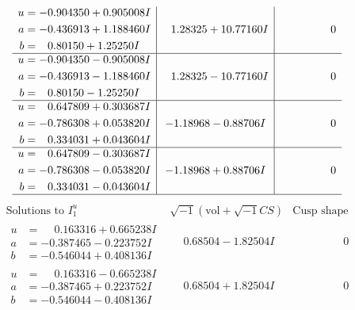 \documentclass[1p]{elsarticle_modified}
\theoremstyle{definition}
\newcommand{\I}{\sqrt{-1}}
\begin{document}
$$\begin{array}{c|c|c}
\begin{aligned}
u &= -0.904350 + 0.905008 I \\
a &= -0.436913 + 1.188460 I \\
b &= \phantom{-}0.80150 + 1.25250 I\end{aligned}
 & \phantom{-}1.28325 + 10.77160 I & \phantom{-0.000000 } 0 \\ \hline\begin{aligned}
u &= -0.904350 - 0.905008 I \\
a &= -0.436913 - 1.188460 I \\
b &= \phantom{-}0.80150 - 1.25250 I\end{aligned}
 & \phantom{-}1.28325 - 10.77160 I & \phantom{-0.000000 } 0 \\ \hline\begin{aligned}
u &= \phantom{-}0.647809 + 0.303687 I \\
a &= -0.786308 + 0.053820 I \\
b &= \phantom{-}0.334031 + 0.043604 I\end{aligned}
 & -1.18968 - 0.88706 I & \phantom{-0.000000 } 0 \\ \hline\begin{aligned}
u &= \phantom{-}0.647809 - 0.303687 I \\
a &= -0.786308 - 0.053820 I \\
b &= \phantom{-}0.334031 - 0.043604 I\end{aligned}
 & -1.18968 + 0.88706 I & \phantom{-0.000000 } 0\\
 \hline 
 \end{array}$$\newpage$$\begin{array}{c|c|c}  
\text{Solutions to }I^u_{1}& \I (\text{vol} + \sqrt{-1}CS) & \text{Cusp shape}\\
 \hline 
\begin{aligned}
u &= \phantom{-}0.163316 + 0.665238 I \\
a &= -0.387465 - 0.223752 I \\
b &= -0.546044 + 0.408136 I\end{aligned}
 & \phantom{-}0.68504 - 1.82504 I & \phantom{-0.000000 } 0 \\ \hline\begin{aligned}
u &= \phantom{-}0.163316 - 0.665238 I \\
a &= -0.387465 + 0.223752 I \\
b &= -0.546044 - 0.408136 I\end{aligned}
 & \phantom{-}0.68504 + 1.82504 I & \phantom{-0.000000 } 0 \\ \hline\begin{aligned}

\end{aligned}
\end{array}$$
\end{document}
